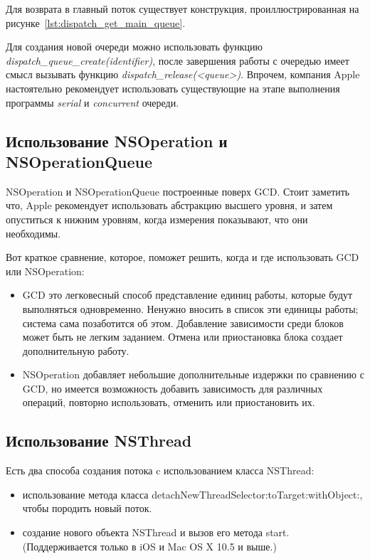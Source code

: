 Для возврата в главный поток существует конструкция, проиллюстрированная
на рисунке~\ref{lst:dispatch_get_main_queue}.


Для создания новой очереди можно использовать функцию \textit{dispatch\_queue\_create(identifier)},
после завершения работы с очередью имеет смысл вызывать функцию \textit{dispatch\_release(<queue>)}.
Впрочем, компания Apple настоятельно рекомендует использовать
существующие на этапе выполнения программы \textit{serial} и \textit{concurrent} очереди.

\subsection{Использование NSOperation и NSOperationQueue}

NSOperation и NSOperationQueue построенные поверх GCD. Стоит заметить что,
Apple рекомендует использовать абстракцию высшего уровня, и затем опуститься
к нижним уровням, когда измерения показывают, что они необходимы.

Вот краткое сравнение, которое, поможет решить, когда и где использовать
GCD или NSOperation:
\begin{itemize}
  \item GCD это легковесный способ представление единиц работы, которые будут
    выполняться одновременно. Ненужно вносить в список эти единицы работы;
    система сама позаботится об этом. Добавление зависимости среди блоков может
    быть не легким заданием. Отмена или приостановка блока создает
    дополнительную работу.
  \item NSOperation добавляет небольшие дополнительные издержки по сравнению с GCD,
    но имеется возможность добавить зависимость для различных операций,
    повторно использовать, отменить или приостановить их.
\end{itemize}


\subsection{Использование NSThread}

Есть два способа создания потока c использованием класса NSThread:
\begin{itemize}
  \item использование метода класса detachNewThreadSelector:toTarget:withObject:,
    чтобы породить новый поток.
  \item создание нового объекта NSThread и вызов его метода start.
    (Поддерживается только в iOS и Mac OS X 10.5 и выше.)
\end{itemize}


